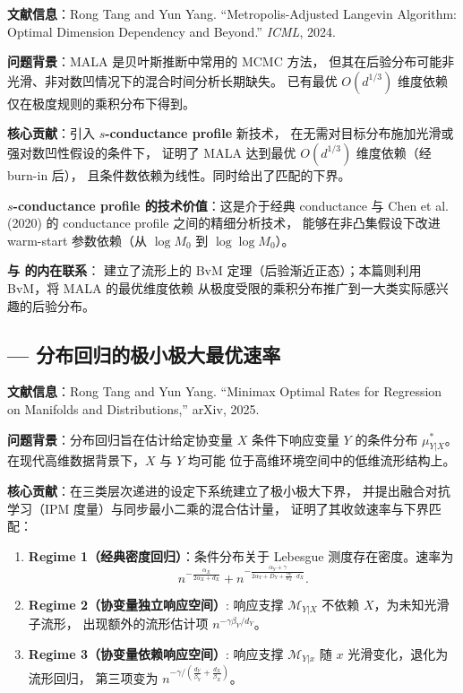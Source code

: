 \documentclass[12pt]{amsbook}
\theoremstyle{plain}
\begin{document}
\textbf{文献信息}：Rong Tang and Yun Yang.
``Metropolis-Adjusted Langevin Algorithm: Optimal Dimension Dependency
and Beyond.'' \textit{ICML}, 2024.

\textbf{问题背景}：MALA 是贝叶斯推断中常用的 MCMC 方法，
但其在后验分布可能非光滑、非对数凹情况下的混合时间分析长期缺失。
已有最优 $O(d^{1/3})$ 维度依赖仅在极度规则的乘积分布下得到。

\textbf{核心贡献}：引入 \textbf{$s$-conductance profile} 新技术，
在无需对目标分布施加光滑或强对数凹性假设的条件下，
证明了 MALA 达到最优 $O(d^{1/3})$ 维度依赖（经 burn-in 后），
且条件数依赖为线性。同时给出了匹配的下界。

\textbf{$s$-conductance profile 的技术价值}：这是介于经典 conductance
与 Chen et al. (2020) 的 conductance profile 之间的精细分析技术，
能够在非凸集假设下改进 warm-start 参数依赖（从 $\log M_0$ 到 $\log\log M_0$）。

\textbf{与 \citep{tang2023robust} 的内在联系}：\citep{tang2023robust} 建立了流形上的
BvM 定理（后验渐近正态）；本篇则利用 BvM，将 MALA 的最优维度依赖
从极度受限的乘积分布推广到一大类实际感兴趣的后验分布。

\subsection{\citep{tang2025regression} --- 分布回归的极小极大最优速率}
\label{sec:tang-arxiv2025a}

\textbf{文献信息}：Rong Tang and Yun Yang.
``Minimax Optimal Rates for Regression on Manifolds and Distributions,''
arXiv, 2025.

\textbf{问题背景}：分布回归旨在估计给定协变量 $X$ 条件下响应变量 $Y$
的条件分布 $\mu_{Y|X}^*$。在现代高维数据背景下，$X$ 与 $Y$ 均可能
位于高维环境空间中的低维流形结构上。

\textbf{核心贡献}：在三类层次递进的设定下系统建立了极小极大下界，
并提出融合对抗学习（IPM 度量）与同步最小二乘的混合估计量，
证明了其收敛速率与下界匹配：

\begin{enumerate}
    \item \textbf{Regime 1（经典密度回归）}：条件分布关于 Lebesgue
          测度存在密度。速率为
          \[
          n^{-\frac{\alpha_X}{2\alpha_X+d_X}} +
          n^{-\frac{\alpha_Y+\gamma}{2\alpha_Y+D_Y+\frac{\alpha_Y}{\alpha_X}\cdot d_X}}.
          \]
    \item \textbf{Regime 2（协变量独立响应空间）}: 响应支撑
          $\mathcal{M}_{Y|X}$ 不依赖 $X$，为未知光滑子流形，
          出现额外的流形估计项 $n^{-\gamma\beta_Y/d_Y}$。
    \item \textbf{Regime 3（协变量依赖响应空间）}: 响应支撑
          $\mathcal{M}_{Y|x}$ 随 $x$ 光滑变化，退化为流形回归，
          第三项变为 $n^{-\gamma/(\frac{d_Y}{\beta_Y}+\frac{d_X}{\beta_X})}$。
\end{enumerate}
\end{document}
